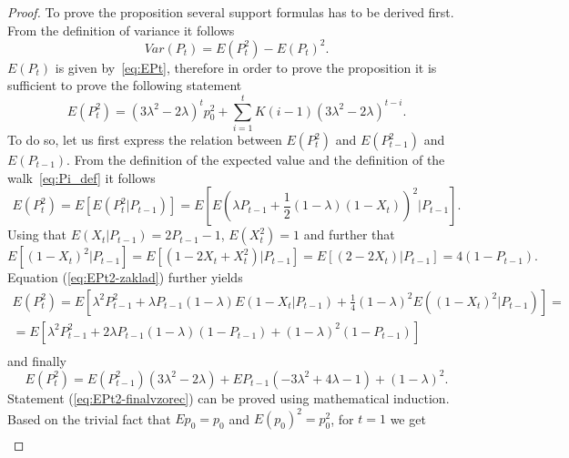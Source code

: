 \documentclass{amsart}
\theoremstyle{definition}
\theoremstyle{plain}
\theoremstyle{plain}
\theoremstyle{plain}
\numberwithin{equation}{section}
\begin{document}
    \begin{proof}
        To prove the proposition several support formulas has to be derived
        first.
        From the definition of variance it follows
        \begin{equation}
            Var(P_{t})=E(P_{t}^{2})-E(P_{t})^{2}.\label{eq:VarP-definition}
        \end{equation}
        $E(P_{t})$ is given by~\eqref{eq:EPt}, therefore in order to prove
        the proposition it is sufficient to prove the following statement
        \begin{equation}
            E(P_{t}^{2})=(3\lambda^{2}-2\lambda)^{t}p_{0}^{2}+\sum_{i=1}^{t}K(i-1)(3\lambda^{2}-2\lambda)^{t-i}.\label{eq:EPt2-finalvzorec}
        \end{equation}
        To do so, let us first express the relation between $E(P_{t}^{2})$
        and $E(P_{t-1}^{2})$ and $E(P_{t-1}).$ From the definition of the
        expected value and the definition of the walk~\eqref{eq:Pi_def} it follows
        \begin{equation}
            E(P_{t}^{2})=E[E(P_{t}^{2}|P_{t-1})]=E[E(\lambda P_{t-1}+\frac{1}{2}(1-\lambda)(1-X_{t}))^{2}|P_{t-1}].\label{eq:EPt2-zaklad}
        \end{equation}
        Using that $E(X_{t}|P_{t-1})=2P_{t-1}-1$, $E(X_{t}^{2})=1$ and further
        that
        \[
            E[(1-X_{t})^{2}|P_{t-1}]=E[(1-2X_{t}+X_{t}^{2})|P_{t-1}]
            =E[(2-2X_{t})|P_{t-1}]= 4(1-P_{t-1}).
        \]
        Equation (\ref{eq:EPt2-zaklad}) further yields
        \begin{gather*}
            E(P_{t}^{2})=E[\lambda^{2}P_{t-1}^{2}+\lambda P_{t-1}(1-\lambda)E(1-X_{t}|P_{t-1})+\frac{1}{4}(1-\lambda)^{2}E((1-X_{t})^{2}|P_{t-1})]=\\
            =E[\lambda^{2}P_{t-1}^{2}+2\lambda P_{t-1}(1-\lambda)(1-P_{t-1})+(1-\lambda)^{2}(1-P_{t-1})]\\
        \end{gather*}
        and finally
        \begin{equation}
            E(P_{t}^{2})=E(P_{t-1}^{2})(3\lambda^{2}-2\lambda)+EP_{t-1}(-3\lambda^{2}+4\lambda-1)+(1-\lambda)^{2}.\label{eq:EPt2-pokrocile}
        \end{equation}
        Statement (\ref{eq:EPt2-finalvzorec}) can be proved using mathematical induction.
        Based on the trivial fact that $Ep_{0}=p_{0}$ and $E(p_{0})^{2}=p_{0}^{2}$,
        for $t=1$ we get
        \begin{gather*}

\end{gather*}
\end{proof}
\end{document}
